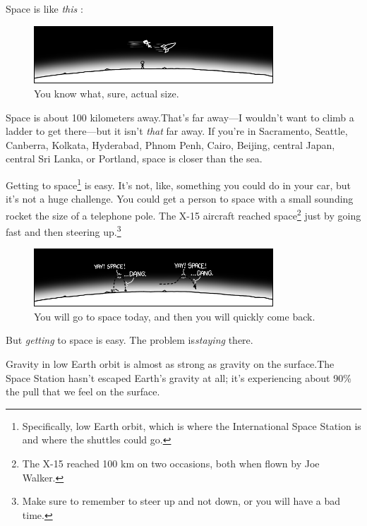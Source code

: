 {{Space is like \emph{this} :}

\begin{figure}[!htbp]
\centering
\includegraphics[scale=0.5, max width=0.8\textwidth]{imgs/a/58/orbit_wide.png}
\caption{You know what, sure, actual size.}
\end{figure}

{Space is about 100 kilometers away.That's far away—I wouldn't want to climb a ladder to get there—but it isn't \emph{that} far away. If you're in Sacramento, Seattle, Canberra, Kolkata, Hyderabad, Phnom Penh, Cairo, Beijing, central Japan, central Sri Lanka, or Portland, space is closer than the sea.}

{Getting to space{\footnote{Specifically, low Earth orbit, which is where the International Space Station is and where the shuttles could go.} } is easy. It's not, like, something you could do in your car, but it's not a huge challenge. You could get a person to space with a small sounding rocket the size of a telephone pole. The X-15 aircraft reached space{\footnote{The X-15 reached 100 km on two occasions, both when flown by Joe Walker.} } just by going fast and then steering up.{\footnote{Make sure to remember to steer up and not down, or you will have a bad time.} } }

\begin{figure}[!htbp]
\centering
\includegraphics[scale=0.5, max width=0.8\textwidth]{imgs/a/58/orbit_x15.png}
\caption{You will go to space today, and then you will quickly come back.}
\end{figure}

{But \emph{getting} to space is easy. The problem is\emph{staying} there.}

{Gravity in low Earth orbit is almost as strong as gravity on the surface.The Space Station hasn't escaped Earth's gravity at all; it's experiencing about 90\% the pull that we feel on the surface.}

}
